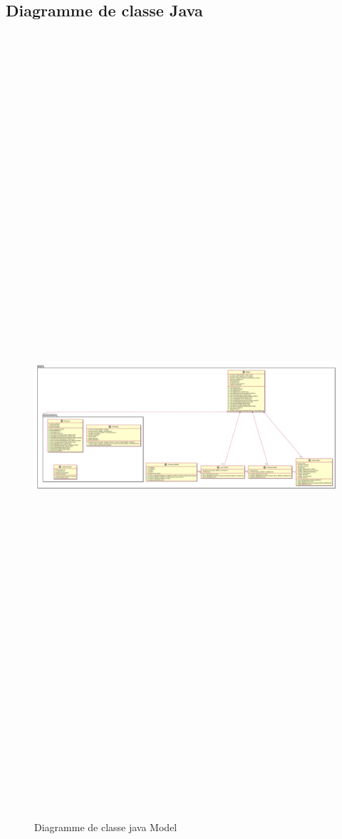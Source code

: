 \documentclass[11pt,a4paper]{report} %
\begin{document}
		
		

		\begin{landscape}
		\section{Diagramme de classe Java}

		
		\begin{figure}[H]
			\centering
			\includegraphics[width = 25cm ,height = 35cm,keepaspectratio]{./Picture/Diagramme de class java Model.png}
			\caption{Diagramme de classe java Model} 
			\label{diagClass}
		\end{figure}
		\newpage
		

\end{landscape}
\end{document}
